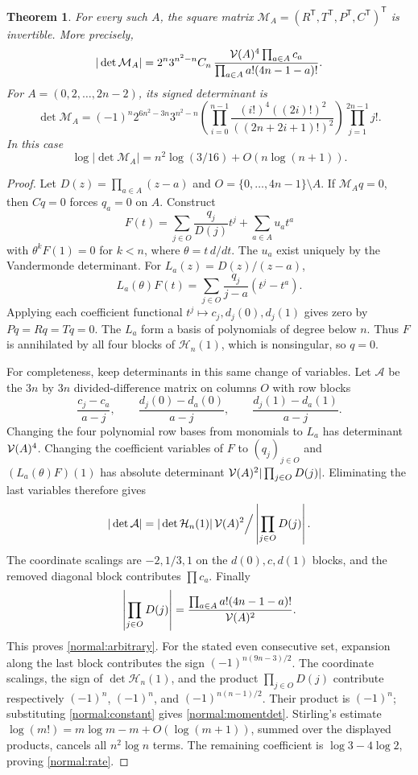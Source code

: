 \documentclass[11pt,a4paper]{article}
\numberwithin{equation}{section}
\newtheorem{theorem}{Theorem}[section]
\theoremstyle{definition}\newtheorem{definition}[theorem]{Definition}
\theoremstyle{remark}\newtheorem{remark}[theorem]{Remark}
\begin{document}
\begin{theorem}\label{normal:normal}
For every such $A$, the square matrix
$\mathcal M_A=(R^{\mathsf T},T^{\mathsf T},P^{\mathsf T},C^{\mathsf T})^{\mathsf T}$ is invertible. More precisely,
\begin{equation}\label{normal:arbitrary}
 |\det\mathcal M_A|
 =2^n3^{n^2-n}C_n\,
 \frac{\mathcal V(A)^4\prod_{a\in A}c_a}
      {\prod_{a\in A}a!(4n-1-a)!}.
\end{equation}
For $A=(0,2,\ldots,2n-2)$, its signed determinant is
\begin{equation}\label{normal:momentdet}
 \det\mathcal M_A=(-1)^n2^{6n^2-3n}3^{n^2-n}
 \left(\prod_{i=0}^{n-1}\frac{(i!)^4((2i)!)^2}{((2n+2i+1)!)^2}\right)
 \prod_{j=1}^{2n-1}j!.
\end{equation}
In this case
\begin{equation}\label{normal:rate}
 \log|\det\mathcal M_A|=n^2\log(3/16)+O(n\log(n+1)).
\end{equation}
\end{theorem}
\begin{proof}
Let $D(z)=\prod_{a\in A}(z-a)$ and $O=\{0,\ldots,4n-1\}\setminus A$. If $\mathcal M_Aq=0$, then $Cq=0$ forces $q_a=0$ on $A$. Construct
\[
 F(t)=\sum_{j\in O}\frac{q_j}{D(j)}t^j+\sum_{a\in A}u_at^a
\]
with $\theta^kF(1)=0$ for $k<n$, where $\theta=t\,d/dt$. The $u_a$ exist uniquely by the Vandermonde determinant. For $L_a(z)=D(z)/(z-a)$,
\[
 L_a(\theta)F(t)=\sum_{j\in O}\frac{q_j}{j-a}(t^j-t^a).
\]
Applying each coefficient functional $t^j\mapsto c_j,d_j(0),d_j(1)$ gives zero by $Pq=Rq=Tq=0$. The $L_a$ form a basis of polynomials of degree below $n$. Thus $F$ is annihilated by all four blocks of $\mathcal H_n(1)$, which is nonsingular, so $q=0$.

For completeness, keep determinants in this same change of variables. Let $\mathcal A$ be the $3n$ by $3n$ divided-difference matrix on columns $O$ with row blocks
\[
 \frac{c_j-c_a}{a-j},\qquad
 \frac{d_j(0)-d_a(0)}{a-j},\qquad
 \frac{d_j(1)-d_a(1)}{a-j}.
\]
Changing the four polynomial row bases from monomials to $L_a$ has determinant $\mathcal V(A)^4$. Changing the coefficient variables of $F$ to $(q_j)_{j\in O}$ and $(L_a(\theta)F)(1)$ has absolute determinant $\mathcal V(A)^2|\prod_{j\in O}D(j)|$. Eliminating the last variables therefore gives
\[
 |\det\mathcal A|=|\det\mathcal H_n(1)|\,
 \mathcal V(A)^2\Big/\left|\prod_{j\in O}D(j)\right|.
\]
The coordinate scalings are $-2,1/3,1$ on the $d(0),c,d(1)$ blocks, and the removed diagonal block contributes $\prod c_a$.
Finally
\[
 \left|\prod_{j\in O}D(j)\right|
 =\frac{\prod_{a\in A}a!(4n-1-a)!}{\mathcal V(A)^2}.
\]
This proves \eqref{normal:arbitrary}. For the stated even consecutive set, expansion along the last block contributes the sign $(-1)^{n(9n-3)/2}$. The coordinate scalings, the sign of $\det\mathcal H_n(1)$, and the product $\prod_{j\in O}D(j)$ contribute respectively $(-1)^n$, $(-1)^n$, and $(-1)^{n(n-1)/2}$. Their product is $(-1)^n$; substituting \eqref{normal:constant} gives \eqref{normal:momentdet}.
Stirling's estimate $\log(m!)=m\log m-m+O(\log(m+1))$, summed over the displayed products, cancels all $n^2\log n$ terms. The remaining coefficient is $\log3-4\log2$, proving \eqref{normal:rate}.
\end{proof}
\end{document}
